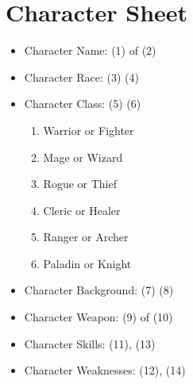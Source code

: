 \documentclass{article}
\begin{document}
\section*{Character Sheet}
\vspace{1cm}
\begin{itemize}
  \item Character Name: \TextField[name=name,width=4cm]{} (1) of \TextField[name=name,width=4cm]{} (2)
  \item Character Race: \TextField[name=name,width=4cm]{} (3) \TextField[name=name,width=4cm]{} (4)
  \item Character Class: \TextField[name=name,width=4cm]{} (5) \TextField[name=name,width=4cm]{} (6)
\begin{multicols}{2}
	\begin{enumerate}
		\item Warrior or Fighter
		\item Mage or Wizard
		\item Rogue or Thief
		\item Cleric or Healer
		\item Ranger or Archer
		\item Paladin or Knight
	\end{enumerate}
\end{multicols}
  \item Character Background: \TextField[name=name,width=4cm]{} (7) \TextField[name=name,width=4cm]{} (8)
  \item Character Weapon: \TextField[name=name,width=4cm]{} (9) of \TextField[name=name,width=4cm]{} (10)
  \item Character Skills: \TextField[name=name,width=4cm]{} (11), \TextField[name=name,width=4cm]{} (13)
  \item Character Weaknesses: \TextField[name=name,width=4cm]{} (12), \TextField[name=name,width=4cm]{} (14)
\end{itemize}

\vspace{2cm}
\end{document}
